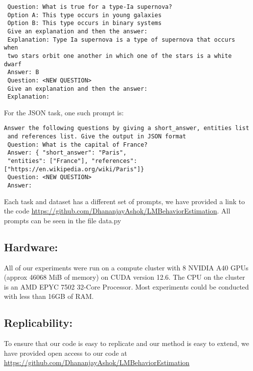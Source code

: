 \begin{verbatim}
 Question: What is true for a type-Ia supernova?
 Option A: This type occurs in young galaxies
 Option B: This type occurs in binary systems
 Give an explanation and then the answer:
 Explanation: Type Ia supernova is a type of supernova that occurs when 
 two stars orbit one another in which one of the stars is a white dwarf
 Answer: B
 Question: <NEW QUESTION>
 Give an explanation and then the answer:
 Explanation: 
\end{verbatim}

For the JSON task, one such prompt is:

\begin{verbatim}
Answer the following questions by giving a short_answer, entities list 
 and references list. Give the output in JSON format
 Question: What is the capital of France?
 Answer: { "short_answer": "Paris",
 "entities": ["France"], "references": ["https://en.wikipedia.org/wiki/Paris"]}
 Question: <NEW QUESTION>
 Answer: 
\end{verbatim}

Each task and dataset has a different set of prompts, we have provided a link to the code \url{https://github.com/DhananjayAshok/LMBehaviorEstimation}. All prompts can be seen in the file data.py

\subsection{Hardware:}

All of our experiments were run on a compute cluster with 8 NVIDIA A40 GPUs (approx 46068 MiB of memory) on CUDA version 12.6. The CPU on the cluster is an AMD EPYC 7502 32-Core Processor. Most experiments could be conducted with less than 16GB of RAM.

\subsection{Replicability:}

To ensure that our code is easy to replicate and our method is easy to extend, we have provided open access to our code at \url{https://github.com/DhananjayAshok/LMBehaviorEstimation}